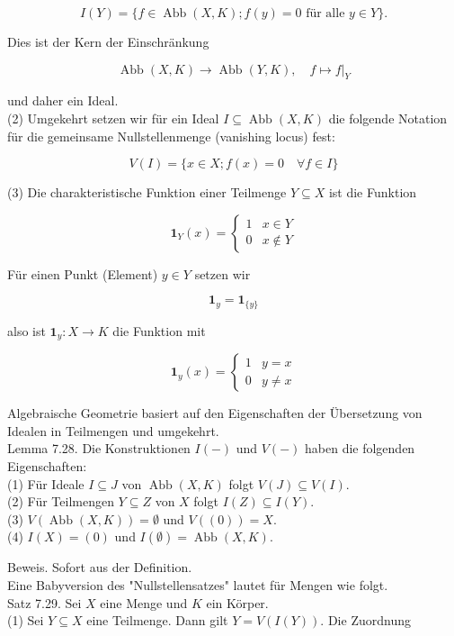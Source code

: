 \documentclass[10pt, letterpaper]{article}
\begin{document}
$$
I(Y)=\{f \in \operatorname{Abb}(X, K) ; f(y)=0 \text { für alle } y \in Y\} .
$$

Dies ist der Kern der Einschränkung

$$
\operatorname{Abb}(X, K) \rightarrow \operatorname{Abb}(Y, K),\left.\quad f \mapsto f\right|_{Y}
$$

und daher ein Ideal.\\
(2) Umgekehrt setzen wir für ein Ideal $I \subseteq \operatorname{Abb}(X, K)$ die folgende Notation für die gemeinsame Nullstellenmenge (vanishing locus) fest:

$$
V(I)=\{x \in X ; f(x)=0 \quad \forall f \in I\}
$$

(3) Die charakteristische Funktion einer Teilmenge $Y \subseteq X$ ist die Funktion

$$
\mathbf{1}_{Y}(x)= \begin{cases}1 & x \in Y \\ 0 & x \notin Y\end{cases}
$$

Für einen Punkt (Element) $y \in Y$ setzen wir

$$
\mathbf{1}_{y}=\mathbf{1}_{\{y\}}
$$

also ist $\mathbf{1}_{y}: X \rightarrow K$ die Funktion mit

$$
\mathbf{1}_{y}(x)= \begin{cases}1 & y=x \\ 0 & y \neq x\end{cases}
$$

Algebraische Geometrie basiert auf den Eigenschaften der Übersetzung von Idealen in Teilmengen und umgekehrt.\\
Lemma 7.28. Die Konstruktionen $I(-)$ und $V(-)$ haben die folgenden Eigenschaften:\\
(1) Für Ideale $I \subseteq J$ von $\operatorname{Abb}(X, K)$ folgt $V(J) \subseteq V(I)$.\\
(2) Für Teilmengen $Y \subseteq Z$ von $X$ folgt $I(Z) \subseteq I(Y)$.\\
(3) $V(\operatorname{Abb}(X, K))=\emptyset$ und $V((0))=X$.\\
(4) $I(X)=(0)$ und $I(\emptyset)=\operatorname{Abb}(X, K)$.

Beweis. Sofort aus der Definition.\\
Eine Babyversion des "Nullstellensatzes" lautet für Mengen wie folgt.\\
Satz 7.29. Sei $X$ eine Menge und $K$ ein Körper.\\
(1) Sei $Y \subseteq X$ eine Teilmenge. Dann gilt $Y=V(I(Y))$. Die Zuordnung
\end{document}
